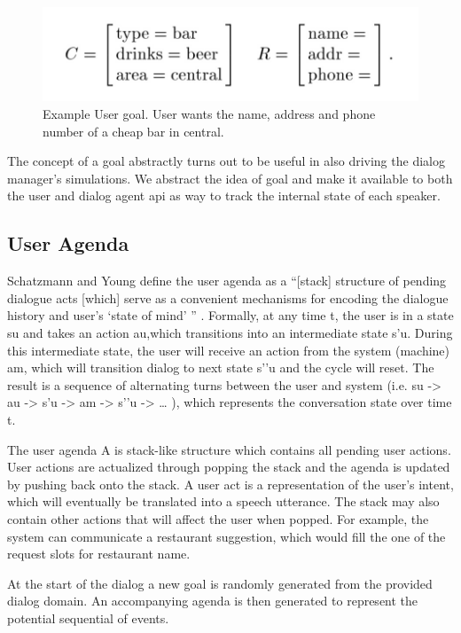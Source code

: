 \begin{figure}[h!]
	\includegraphics[width=\linewidth]{diagrams/schatzmann_goal_fig.jpeg}
	\caption{Example User goal. User wants the name, address and phone number of a cheap bar in central.  }
	\label{fig:goals1}
\end{figure}

The concept of a goal abstractly turns out to be useful in also driving the dialog manager's simulations. We abstract the idea of goal and make it available to both the user and dialog agent api as way to track the internal state of each speaker. 

\subsection{User Agenda} 

Schatzmann and Young define the user agenda as a “[stack] structure of pending dialogue acts [which] serve as a convenient mechanisms for encoding the dialogue history and user’s ‘state of mind’ ” \cite{Schatzmann2009TheHA}. Formally, at any time t, the user is in a state su  and takes an action au,which transitions into an intermediate state s’u. During this intermediate state, the user will receive an action from the system (machine) am, which will transition dialog to next state s’’u and the cycle will reset. The result is a sequence of alternating turns between the user and system (i.e. su -> au -> s’u -> am -> s’’u -> … ), which represents the conversation state over time t.
 
The user agenda A is stack-like structure which contains all pending user actions. User actions are actualized through popping the stack and the agenda is updated by pushing back onto the stack. A user act is a representation of the user’s intent, which will eventually be translated into a speech utterance. The stack may also contain other actions that will affect the user when popped. For example, the system can communicate a restaurant suggestion, which would fill the one of the request slots for restaurant name.  

At the start of the dialog a new goal is randomly generated from the provided dialog domain. An accompanying agenda is then generated to represent the potential sequential of events. 

